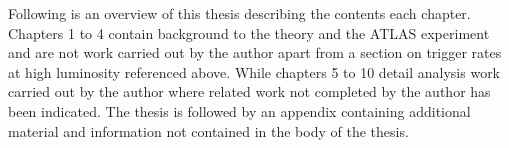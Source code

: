 












Following is an overview of this thesis describing the contents each chapter. Chapters 1 to 4 contain background to the theory and the ATLAS experiment and are not work carried out by the author apart from a section on trigger rates at high luminosity referenced above. While chapters 5 to 10 detail analysis work carried out by the author where related work not completed by the author has been indicated. The thesis is followed by an appendix containing additional material and information not contained in the body of the thesis.

